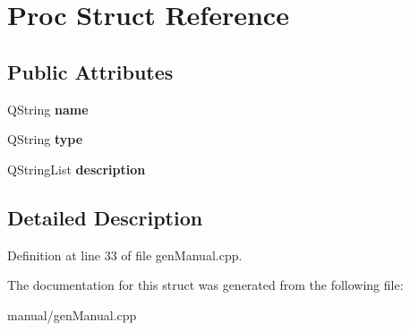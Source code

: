 \hypertarget{struct_proc}{}\section{Proc Struct Reference}
\label{struct_proc}
\subsection*{Public Attributes}
\begin{DoxyCompactItemize}
\item 
\mbox{\label{struct_proc_aa83cfa2f77adba0b14c5ad5bd6328f8c}} 
Q\+String {\bfseries name}
\item 
\mbox{\label{struct_proc_a488ee7b500aae9d0b97348f6345df78c}} 
Q\+String {\bfseries type}
\item 
\mbox{\label{struct_proc_a1a81e35defcfc542b44de2c9867f9b25}} 
Q\+String\+List {\bfseries description}
\end{DoxyCompactItemize}


\subsection{Detailed Description}


Definition at line 33 of file gen\+Manual.\+cpp.



The documentation for this struct was generated from the following file\+:\begin{DoxyCompactItemize}
\item 
manual/gen\+Manual.\+cpp\end{DoxyCompactItemize}
